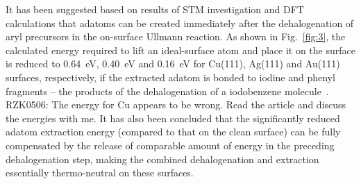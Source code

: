 \documentclass[%
 reprint,
 amsmath,amssymb,
 aps,
prb,
floatfix,
]{revtex4-2}
\newcommand{\lock}{\color{red}}
\newcommand{\lock}{\color{red}}
\newcommand{\comm}{\color{Purple}} %
\begin{document}
{\lock

It has been suggested based on results of STM investigation and DFT calculations that adatoms can be created immediately after the dehalogenation of aryl precursors in the on-surface Ullmann reaction. As shown in Fig.~\ref{fig:3}, the calculated energy required to lift an ideal-surface atom and place it on the surface is reduced to \SI{0.64}{\electronvolt}, \SI{0.40}{\electronvolt} and \SI{0.16}{\electronvolt} for Cu(111), Ag(111) and Au(111) surfaces, respectively, if the extracted adatom is bonded to iodine and phenyl fragments -- the products of the dehalogenation of a iodobenzene molecule~\cite{chemeurope2017}. {\comm RZK0506: The energy for Cu appears to be wrong. Read the article and discuss the energies with me.}
%
It has also been concluded that the significantly reduced adatom extraction energy (compared to that on the clean surface) can be fully compensated by the release of comparable amount of energy in the preceding dehalogenation step, making the combined dehalogenation and extraction essentially thermo-neutral on these surfaces.




}



\end{document}
